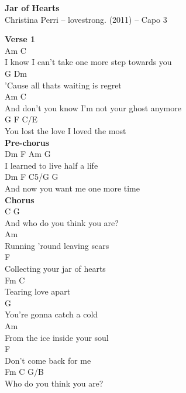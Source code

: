 \documentclass[a4paper]{article}
\begin{document}
    \begin{center}
        \textbf{Jar of Hearts}
        ~\\
        Christina Perri -- lovestrong. (2011)
         -- Capo 3
    \end{center}
    {
        \scriptsize
        \textbf{Verse 1}
        ~\\
        {
            \cutive
            \obeyspaces
Am                            C
\\
I know I can't take one more step towards you
\\
G                              Dm
\\
'Cause all thats waiting is regret
\\
Am                               C
\\
And don't you know I'm not your ghost anymore
\\
G                              F   C/E
\\
You lost the love I loved the most
\\

        }
        \textbf{Pre-chorus}
        ~\\
        {
            \cutive
            \obeyspaces
Dm           F    Am      G
\\
I learned to live half a life
\\
Dm           F             C5/G  G
\\
And now you want me one more time
\\

        }
        \textbf{Chorus}
        ~\\
        {
            \cutive
            \obeyspaces
C                           G
\\
  And who do you think you are?
\\
                        Am
\\
Running 'round leaving scars
\\
                        F
\\
Collecting your jar of hearts
\\
 Fm            C
\\
Tearing love apart
\\
                      G
\\
You're gonna catch a cold
\\
                          Am
\\
From the ice inside your soul
\\
                     F
\\
Don't come back for me
\\
Fm                    C   G/B
\\
Who do you think you are?
\\

}}
\end{document}
